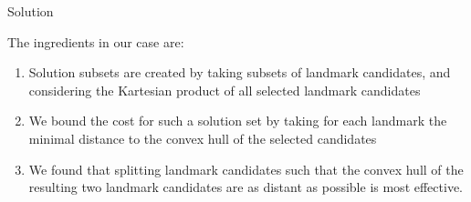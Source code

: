 \documentclass[portrait,final,a0paper,fontscale=0.277]{baposter}
\newcommand*{\normLR}[1]{\left\| #1 \right\|}%
\newcommand*{\SET}[1]  {\ensuremath{\mathcal{#1}}}
\newcommand*{\VEC}[1]  {\ensuremath{\boldsymbol{#1}}}
\renewcommand{\l}{\VEC l}
\newcommand{\J}{\SET{P}}
\newcommand{\Selection}{\mathbf{S}}
\newcommand{\Params}{\VEC\Theta}
\begin{document}
\begin{poster}
\begin{posterbox}[name=solution,column=1,row=0,below=results,above=strategy]{Solution}

  The ingredients in our case are:
 \begin{enumerate}
 \item Solution subsets are created by taking subsets of landmark
 candidates, and considering the Kartesian product of all selected landmark
 candidates
 \item We bound the cost for such a solution set by taking for each
 landmark the minimal distance to the convex hull of the selected candidates
 \item We found that splitting landmark candidates such that the convex hull of the resulting two landmark candidates are as distant as possible is most effective.
 \end{enumerate}
  \end{posterbox}

\end{poster}
\end{document}
